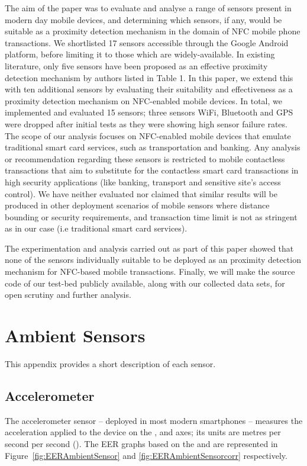 \documentclass{article}
\begin{document}
The aim of the paper was to evaluate and analyse a range of sensors present in modern day mobile devices, and determining which sensors, if any, would be suitable as a proximity detection mechanism in the domain of NFC mobile phone transactions.  We shortlisted 17 sensors accessible through the Google Android platform, before limiting it to those which are widely-available.  In existing literature, only five sensors have been proposed as an effective proximity detection mechanism by authors listed in Table 1. In this paper, we extend this with ten additional sensors by evaluating their suitability and effectiveness as a proximity detection mechanism on NFC-enabled mobile devices.  In total, we implemented and evaluated 15 sensors; three sensors WiFi, Bluetooth and GPS were dropped after initial tests as they were showing high sensor failure rates.  The scope of our analysis focuses on NFC-enabled mobile devices that emulate traditional smart card services, such as transportation and banking.  Any analysis or recommendation regarding these sensors is restricted to mobile contactless transactions that aim to substitute for the contactless smart card transactions in high security applications (like banking, transport and sensitive site's access control). We have neither evaluated nor claimed that similar results will be produced in other deployment scenarios of mobile sensors where distance bounding or security requirements, and transaction time limit is not as stringent as in our case (i.e traditional smart card services). 

The experimentation and analysis carried out as part of this paper showed that none of the sensors individually suitable to be deployed as an proximity detection mechanism for NFC-based mobile transactions. Finally, we will make the source code of our test-bed publicly available, along with our collected data sets, for open scrutiny and further analysis.



{\footnotesize 
}
\appendix
\section{Ambient Sensors}
\label{sec:AmbientSensors}
This appendix provides a short description of each sensor. 

\subsection{Accelerometer}
The accelerometer sensor -- deployed in most modern smartphones -- measures the acceleration applied to the device on the ,  and  axes; its units are metres per second per second (). The EER graphs based on the  and  are represented in Figure~\ref{fig:EERAmbientSensor} and \ref{fig:EERAmbientSensorcorr} respectively.
\end{document}
